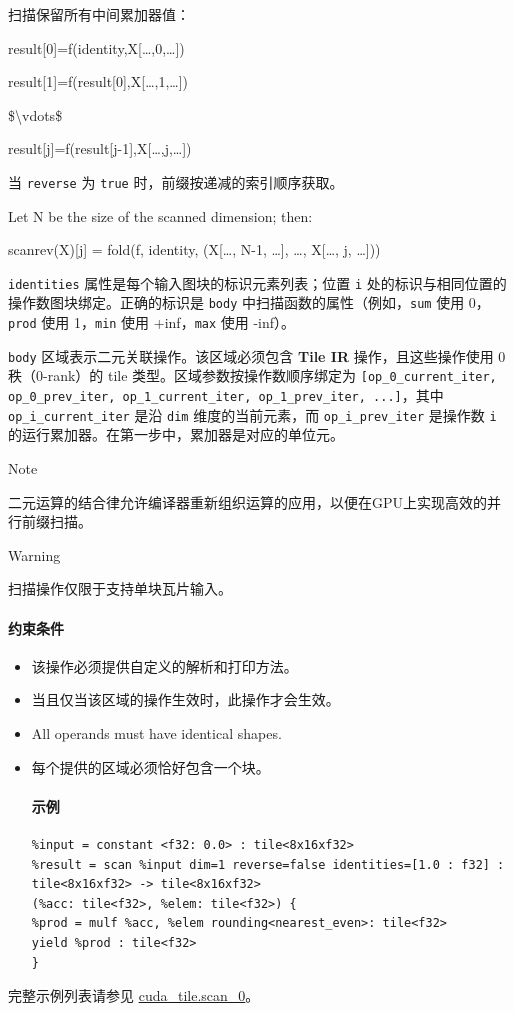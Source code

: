 \documentclass{article}
\begin{document}
扫描保留所有中间累加器值：


result[0]=f(identity,X[…,0,…])  

result[1]=f(result[0],X[…,1,…])  

\$\textbackslash{}vdots\$  

result[j]=f(result[j-1],X[…,j,…])

当 \texttt{reverse} 为 \texttt{true} 时，前缀按递减的索引顺序获取。

Let N be the size of the scanned dimension; then:


scanrev(X)[j] = fold(f, identity, (X[…, N-1, …], …, X[…, j, …]))

\texttt{identities} 属性是每个输入图块的标识元素列表；位置 \texttt{i} 处的标识与相同位置的操作数图块绑定。正确的标识是 \texttt{body} 中扫描函数的属性（例如，\texttt{sum} 使用 0，\texttt{prod} 使用 1，\texttt{min} 使用 +inf，\texttt{max} 使用 -inf）。


\texttt{body} 区域表示二元关联操作。该区域必须包含 \textbf{Tile IR} 操作，且这些操作使用 0 秩（0-rank）的 tile 类型。区域参数按操作数顺序绑定为 \texttt{[op\_0\_current\_iter, op\_0\_prev\_iter, op\_1\_current\_iter, op\_1\_prev\_iter, ...]}，其中 \texttt{op\_i\_current\_iter} 是沿 \texttt{dim} 维度的当前元素，而 \texttt{op\_i\_prev\_iter} 是操作数 \texttt{i} 的运行累加器。在第一步中，累加器是对应的单位元。


Note


二元运算的结合律允许编译器重新组织运算的应用，以便在GPU上实现高效的并行前缀扫描。



Warning


扫描操作仅限于支持单块瓦片输入。



\paragraph{约束条件}

\begin{itemize}
\item 该操作必须提供自定义的解析和打印方法。
\item 当且仅当该区域的操作生效时，此操作才会生效。
\item All operands must have identical shapes.
\item 每个提供的区域必须恰好包含一个块。


\paragraph{示例}

\begin{lstlisting}
%input = constant <f32: 0.0> : tile<8x16xf32>
%result = scan %input dim=1 reverse=false identities=[1.0 : f32] : tile<8x16xf32> -> tile<8x16xf32>
(%acc: tile<f32>, %elem: tile<f32>) {
%prod = mulf %acc, %elem rounding<nearest_even>: tile<f32>
yield %prod : tile<f32>
}
\end{lstlisting}

\end{itemize}
完整示例列表请参见 \href{https://docs.nvidia.com/cuda/tile-ir/latest/sections/appendix.html#example-cuda-tile-scan-0}{cuda\_tile.scan\_0}。
\end{document}
